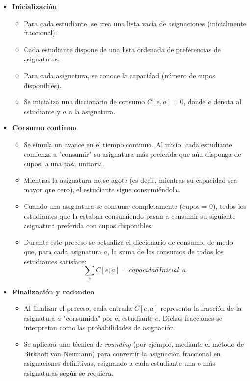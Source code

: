 \documentclass{article}
\begin{document}
\begin{itemize}
  \item \textbf{Inicialización}
        \begin{itemize}
          \item Para cada estudiante, se crea una lista vacía de asignaciones (inicialmente fraccional).
          \item Cada estudiante dispone de una lista ordenada de preferencias de asignaturas.
          \item Para cada asignatura, se conoce la capacidad (número de cupos disponibles).
          \item Se inicializa una diccionario de consumo $C[e,a] = 0$, donde $e$ denota al estudiante y 
          $a$ a la asignatura.
        \end{itemize}

  \item \textbf{Consumo continuo}
        \begin{itemize}
          \item Se simula un avance en el tiempo continuo. Al inicio, cada estudiante comienza a 
          "consumir" su asignatura más preferida que aún disponga de cupos, a una tasa unitaria.
          \item Mientras la asignatura no se agote (es decir, mientras su capacidad sea mayor que cero), 
          el estudiante sigue consumiéndola.
          \item Cuando una asignatura se consume completamente (cupos = 0), todos los estudiantes que la 
          estaban consumiendo pasan a consumir su siguiente asignatura preferida con cupos disponibles.
          \item Durante este proceso se actualiza el diccionario de consumo, de modo que, para cada 
          asignatura $a$, la suma de los consumos de todos los estudiantes satisface:
          $$
          \sum_{e} C[e,a] = capacidadInicial: a.
          $$
        \end{itemize}

  \item \textbf{Finalización y redondeo}
        \begin{itemize}
          \item Al finalizar el proceso, cada entrada $C[e,a]$ representa la fracción de la 
          asignatura $a$ "consumida" por el estudiante $e$. Dichas fracciones se interpretan como 
          las probabilidades de asignación.
          \item Se aplicará una técnica de \textit{rounding} (por ejemplo, mediante el método 
          de Birkhoff von Neumann) para convertir la asignación fraccional en asignaciones definitivas, 
          asignando a cada estudiante una o más asignaturas según se requiera.
        \end{itemize}
\end{itemize}
\end{document}
